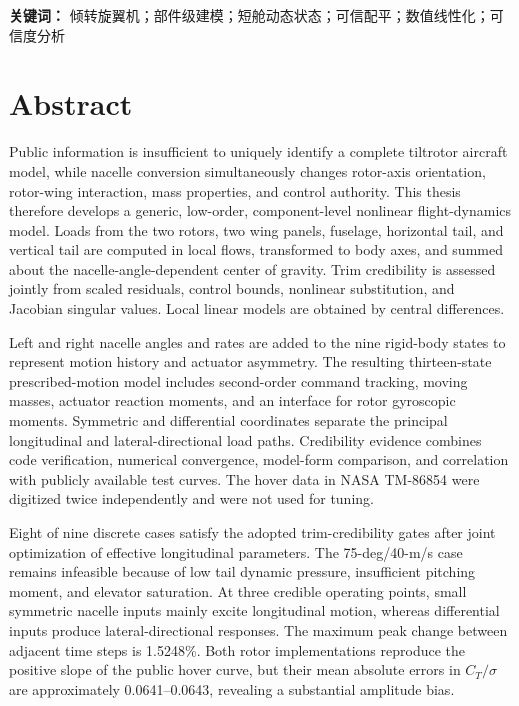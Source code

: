\documentclass[UTF8,12pt,oneside,openany,fontset=windows]{ctexbook}
\begin{document}
\textbf{关键词：} 倾转旋翼机；部件级建模；短舱动态状态；可信配平；数值线性化；可信度分析

\chapter*{Abstract}
\small

Public information is insufficient to uniquely identify a complete tiltrotor aircraft model, while nacelle conversion simultaneously changes rotor-axis orientation, rotor-wing interaction, mass properties, and control authority. This thesis therefore develops a generic, low-order, component-level nonlinear flight-dynamics model. Loads from the two rotors, two wing panels, fuselage, horizontal tail, and vertical tail are computed in local flows, transformed to body axes, and summed about the nacelle-angle-dependent center of gravity. Trim credibility is assessed jointly from scaled residuals, control bounds, nonlinear substitution, and Jacobian singular values. Local linear models are obtained by central differences.

Left and right nacelle angles and rates are added to the nine rigid-body states to represent motion history and actuator asymmetry. The resulting thirteen-state prescribed-motion model includes second-order command tracking, moving masses, actuator reaction moments, and an interface for rotor gyroscopic moments. Symmetric and differential coordinates separate the principal longitudinal and lateral-directional load paths. Credibility evidence combines code verification, numerical convergence, model-form comparison, and correlation with publicly available test curves. The hover data in NASA TM-86854 were digitized twice independently and were not used for tuning.

Eight of nine discrete cases satisfy the adopted trim-credibility gates after joint optimization of effective longitudinal parameters. The 75-deg/40-m/s case remains infeasible because of low tail dynamic pressure, insufficient pitching moment, and elevator saturation. At three credible operating points, small symmetric nacelle inputs mainly excite longitudinal motion, whereas differential inputs produce lateral-directional responses. The maximum peak change between adjacent time steps is 1.5248\%. Both rotor implementations reproduce the positive slope of the public hover curve, but their mean absolute errors in \(C_T/\sigma\) are approximately 0.0641--0.0643, revealing a substantial amplitude bias.
\end{document}
